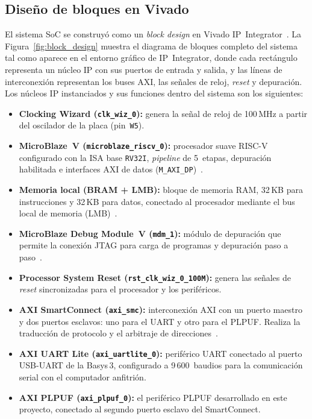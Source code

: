 \subsection{Diseño de bloques en Vivado}
\label{sec:block_design}

El sistema SoC se construyó como un \textit{block design} en Vivado
IP~Integrator~\cite{ug994}. La Figura~\ref{fig:block_design} muestra el
diagrama de bloques completo del sistema tal como aparece en el entorno
gráfico de IP~Integrator, donde cada rectángulo representa un núcleo IP con
sus puertos de entrada y salida, y las líneas de interconexión representan
los buses AXI, las señales de reloj, \textit{reset} y depuración. Los
núcleos IP instanciados y sus funciones dentro del sistema son los
siguientes:

\begin{itemize}
  \item \textbf{Clocking Wizard (\texttt{clk\_wiz\_0}):} genera la señal de
    reloj de 100\,MHz a partir del oscilador de la placa (pin~\texttt{W5}).

  \item \textbf{MicroBlaze~V (\texttt{microblaze\_riscv\_0}):} procesador
    suave RISC-V configurado con la ISA base \texttt{RV32I}, \textit{pipeline} de 5~etapas,
    depuración habilitada e interfaces AXI de datos
    (\texttt{M\_AXI\_DP})~\cite{ug1629}.

  \item \textbf{Memoria local (BRAM + LMB):} bloque de memoria RAM, 32\,KB para instrucciones y 32\,KB para datos, conectado al
    procesador mediante el bus local de memoria (LMB)~\cite{ug1711}.

  \item \textbf{MicroBlaze Debug Module~V (\texttt{mdm\_1}):} módulo de
    depuración que permite la conexión JTAG para carga de programas y
    depuración paso a paso~\cite{ug1629}.

  \item \textbf{Processor System Reset (\texttt{rst\_clk\_wiz\_0\_100M}):}
    genera las señales de \textit{reset} sincronizadas para el procesador y
    los periféricos.

  \item \textbf{AXI SmartConnect (\texttt{axi\_smc}):} interconexión AXI con
    un puerto maestro y dos puertos esclavos: uno para el UART y otro para el
    PLPUF. Realiza la traducción de protocolo y el arbitraje de
    direcciones~\cite{ug1037}.

  \item \textbf{AXI UART Lite (\texttt{axi\_uartlite\_0}):} periférico UART
    conectado al puerto USB-UART de la Basys\,3, configurado a 9\,600~baudios
    para la comunicación serial con el computador anfitrión.

  \item \textbf{AXI PLPUF (\texttt{axi\_plpuf\_0}):} el periférico PLPUF
    desarrollado en este proyecto, conectado al segundo puerto esclavo del
    SmartConnect.
\end{itemize}

